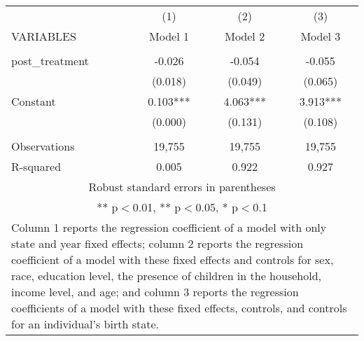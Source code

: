 \begin{tabular}{lccc}
\hline
 & (1) & (2) & (3) \\
VARIABLES & Model 1 & Model 2 & Model 3 \\ \hline
 &  &  &  \\
post\_treatment & -0.026 & -0.054 & -0.055 \\
 & (0.018) & (0.049) & (0.065) \\
Constant & 0.103*** & 4.063*** & 3.913*** \\
 & (0.000) & (0.131) & (0.108) \\
 &  &  &  \\
Observations & 19,755 & 19,755 & 19,755 \\
 R-squared & 0.005 & 0.922 & 0.927 \\ \hline
\multicolumn{4}{c}{\small Robust standard errors in parentheses} \\
\multicolumn{4}{c}{\small *** p$<$0.01, ** p$<$0.05, * p$<$0.1} \\
\multicolumn{4}{p{0.8\linewidth}}{\small Column 1 reports the
regression coefficient of a model with only state and year fixed effects; column 2 reports the
regression coefficient of a model with these fixed effects and controls for sex, race, education
level, the presence of children in the household, income level, and age; and column 3 reports
the regression coefficients of a model with these fixed effects, controls, and controls for an
individual’s birth state.} \\
\end{tabular}
